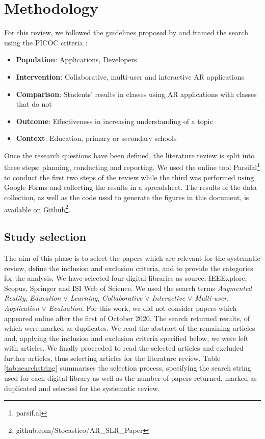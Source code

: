 
\section{Methodology}\label{sec:methods}
For this review, we followed the guidelines proposed by \citet{kitchenham2009systematic} and framed the search using the PICOC criteria \citep{petticrew2008systematic}:
\begin{itemize}
    \item \textbf{Population}: Applications, Developers
    \item \textbf{Intervention}: Collaborative, multi-user and interactive \gls{AR} applications
    \item \textbf{Comparison}: Students' results in classes using AR applications with classes that do not
    \item \textbf{Outcome}: Effectiveness in increasing understanding of a topic
    \item \textbf{Context}: Education, primary or secondary schools
\end{itemize}

Once the research questions have been defined, the literature review is split into three steps: planning, conducting and reporting. We used the online tool Parsifal\footnote{parsif.al} to conduct the first two steps of the review while the third was performed using Google Forms and collecting the results in a spreadsheet. The results of the data collection, as well as the code used to generate the figures in this document, is available on Github\footnote{github.com/Stocastico/AR\_SLR\_Paper}.

\subsection{Study selection}
The aim of this phase is to select the papers which are relevant for the systematic review, define the inclusion and exclusion criteria, and to provide the categories for the analysis.
We have selected four digital libraries as source: IEEExplore, Scopus, Springer and ISI Web of Science. We used the search terms \emph{Augmented Reality}, \emph{Education} $\lor$ \emph{Learning}, \emph{Collaborative} $\lor$ \emph{Interactive} $\lor$ \emph{Multi-user}, \emph{Application} $\lor$ \emph{Evaluation}. For this work, we did not consider papers which appeared online after the first of October 2020. The search returned \allPapers results, of which \duplPapers were marked as duplicates. We read the abstract of the remaining \papersCheckAbstract articles and, applying the inclusion and exclusion criteria specified below, we were left with \papersToRead articles. We finally proceeded to read the selected articles and excluded \papersExludedAfterReading further articles, thus selecting \papersSelected articles for the literature review.
Table \ref{tab:searchstring} summarises the selection process, specifying the search string used for each digital library as well as the number of papers returned, marked as duplicated and selected for the systematic review.

